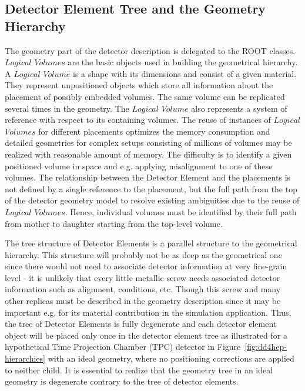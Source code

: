 \documentclass[10pt,a4paper]{article}
\begin{document}
\subsection{Detector Element Tree and the Geometry Hierarchy}
\label{subsect:detelement-hierarchy}
\noindent
The geometry part of the detector description is delegated to the ROOT classes.
$Logical$ $Volumes$ are the basic objects used in building the geometrical hierarchy. 
A $Logical$ $Volume$ is a shape with its dimensions and consist of a given material. 
They represent unpositioned objects which store all information about 
the placement of possibly embedded volumes. The same
volume can be replicated several times in the geometry. The $Logical$ $Volume$ also 
represents a system of reference with respect to its containing volumes.
The reuse of instances of $Logical$ $Volumes$ for different placements 
optimizes the memory consumption and detailed geometries for complex setups
consisting of millions of volumes may be realized with reasonable amount of memory.
The difficulty is to identify a given positioned volume 
in space and e.g. applying misalignment to one of these volumes. 
The relationship between the Detector Element and the placements
is not defined by a single reference to the placement, but the full path 
from the top of the detector geometry model to resolve existing
ambiguities due to the reuse of $Logical$ $Volumes$.
Hence, individual volumes must be identified by their full path from mother 
to daughter starting from the top-level volume. 

\noindent
The tree structure of
Detector Elements is a parallel structure to the geometrical hierarchy.
This structure will probably not be as deep as the geometrical one since 
there would not need to associate detector information at very fine-grain 
level - it is unlikely that every little metallic screw
needs associated detector information such as alignment, conditions, etc.
Though this screw and many other replicas must be described in the geometry 
description since it may be important e.g. for its material contribution 
in the simulation application. Thus, the tree of Detector Elements is
fully degenerate and each detector element object will be placed only 
once in the detector element tree as illustrated for a hypothetical
Time Projection Chamber (TPC) detector in 
Figure~\ref{fig:dd4hep-hierarchies} with an ideal geometry,
where no positioning corrections are applied to neither child. It is essential to 
realize that the geometry tree in an ideal geometry is degenerate contrary 
to the tree of detector elements.
\end{document}
